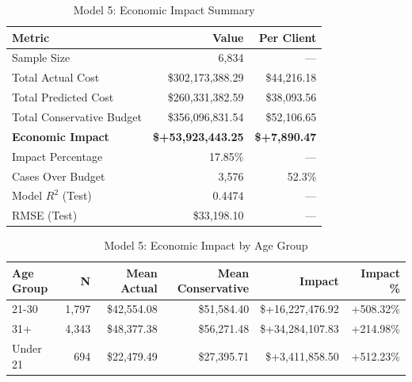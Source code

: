 \begin{table}[htbp]
\centering
\small
\caption{Model 5: Economic Impact Summary}
\label{tab:model5_impact_summary}
\begin{tabular}{lrr}
\toprule
\textbf{Metric} & \textbf{Value} & \textbf{Per Client} \\
\midrule
Sample Size & 6,834 & --- \\
\midrule
Total Actual Cost & \$302,173,388.29 & \$44,216.18 \\
Total Predicted Cost & \$260,331,382.59 & \$38,093.56 \\
Total Conservative Budget & \$356,096,831.54 & \$52,106.65 \\
\midrule
\textbf{Economic Impact} & \textbf{\$+53,923,443.25} & \textbf{\$+7,890.47} \\
Impact Percentage & 17.85\% & --- \\
\midrule
Cases Over Budget & 3,576 & 52.3\% \\
\midrule
Model $R^2$ (Test) & 0.4474 & --- \\
RMSE (Test) & \$33,198.10 & --- \\
\bottomrule
\end{tabular}
\end{table}

\begin{table}[htbp]
\centering
\small
\caption{Model 5: Economic Impact by Age Group}
\label{tab:model5_impact_age}
\begin{tabular}{lrrrrr}
\toprule
\textbf{Age Group} & \textbf{N} & \textbf{Mean Actual} & \textbf{Mean Conservative} & \textbf{Impact} & \textbf{Impact \%} \\
\midrule
21-30 & 1,797 & \$42,554.08 & \$51,584.40 & \$+16,227,476.92 & +508.32\% \\
31+ & 4,343 & \$48,377.38 & \$56,271.48 & \$+34,284,107.83 & +214.98\% \\
Under 21 & 694 & \$22,479.49 & \$27,395.71 & \$+3,411,858.50 & +512.23\% \\
\bottomrule
\end{tabular}
\end{table}

